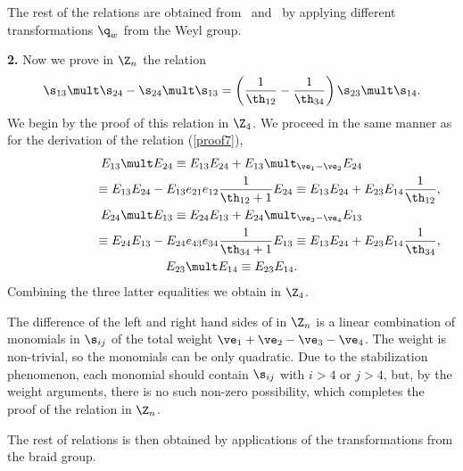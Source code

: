The rest of the relations  are obtained from~ and~
by applying dif\/ferent transformations $\q_w$ from the Weyl group.

{\bf 2.} Now we prove in $\Z_n$ the relation
\begin{gather}\label{proof11}
\s_{13}\mult\s_{24}-\s_{24}\mult\s_{13}=
\left(\frac{1}{\th_{12}}-\frac{1}{\th_{34}}\right)\s_{23}\mult\s_{14}  .
\end{gather}
We begin by the proof of this relation in $\Z_4$. We proceed in the same manner as for the derivation of the
relation (\ref{proof7}),
\begin{gather*}E_{13}\mult E_{24}\equiv E_{13}E_{24}+E_{13}\mult_{\ve_1-\ve_2} E_{24} \\
\phantom{E_{13}\mult E_{24}}{} \equiv
E_{13}E_{24}-E_{13}e_{21}e_{12}  \frac{1}{\th_{12}+1} E_{24}
 \equiv E_{13}E_{24}+E_{23}E_{14} \frac{1}{\th_{12}}  ,\\
 E_{24}\mult E_{13}\equiv E_{24}E_{13}+E_{24}\mult_{\ve_3-\ve_4} E_{13}\\
 \phantom{E_{24}\mult E_{13}}{}  \equiv
E_{24}E_{13}-E_{24}e_{43}e_{34}  \frac{1}{\th_{34}+1} E_{13} \equiv E_{13}E_{24}+E_{23}E_{14}  \frac{1}{\th_{34}}  ,\\
 E_{23}\mult E_{14} \equiv E_{23}E_{14}  .
 \end{gather*}
Combining the three latter equalities we obtain  in $\Z_4$.


The dif\/ference of the left and right hand sides of  in $\Z_n$ is a linear combination of monomials in $\s_{ij}$ of
the total weight $\ve_1+\ve_2-\ve_3-\ve_4$. The weight is non-trivial, so the monomials can be only quadratic.
Due to the stabilization phenomenon, each monomial should contain $\s_{ij}$ with $i>4$ or $j>4$, but, by the weight arguments,
there is no such non-zero possibility, which completes the proof of the relation  in $\Z_n$.


The rest of relations  is then obtained by applications of the transformations from the braid group.

